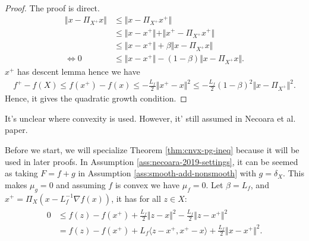 \documentclass[12pt]{report}
\begin{document}
            \begin{proof}
                The proof is direct. 
                \begin{align}
                    \Vert x - \Pi_{X^+}x\Vert 
                    &\le \Vert x - \Pi_{X^+}x^+\Vert
                    \\
                    &\le \Vert x - x^+\Vert + \Vert x^+ - \Pi_{X^+}x^+\Vert
                    \\
                    &\le \Vert x - x^+\Vert + \beta \Vert x - \Pi_{X^+}x\Vert
                    \\
                    \iff 
                    0 &\le \Vert x - x^+\Vert - (1 - \beta) \Vert x - \Pi_{X^+}x\Vert. 
                \end{align}
                $x^+$ has descent lemma hence we have 
                \begin{align*}
                    f^+ - f(X) \le f(x^+) - f(x) 
                    \le - \frac{L_f}{2}\Vert x^+ - x\Vert^2 
                    \le - \frac{L_f}{2}(1 - \beta)^2 \Vert x - \Pi_{X^+}\Vert^2. 
                \end{align*}
                Hence, it gives the quadratic growth condition. 
            \end{proof}
            \begin{remark}
                It's unclear where convexity is used. 
                However, it' still assumed in Necoara et al. paper. 
            \end{remark}
            Before we start, we will specialize Theorem \ref{thm:cnvx-pg-ineq} because it will be used in later proofs. 
            In Assumption \ref{ass:necoara-2019-settings}, it can be seemed as taking $F = f + g$ in Assumption \ref{ass:smooth-add-nonsmooth} with $g = \delta_{X}$. 
            This makes $\mu_g = 0$ and assuming $f$ is convex we have $\mu_f = 0$. 
            Let $\beta = L_f$, and $x^+ = \Pi_{X}(x - L_f^{-1}\nabla f(x))$, it has for all $z \in X$: 
            \begin{align}\label{ineq:proj-grad}
                \begin{split}
                    0 &\le 
                    f(z) - f(x^+) + \frac{L_f}{2}\Vert z - x\Vert^2
                    - \frac{L_f}{2}\Vert z - x^+\Vert^2
                    \\
                    &= 
                    f(z) - f(x^+) + L_f\langle z - x^+, x^+ - x\rangle
                    + \frac{L_f}{2}\Vert x - x^+\Vert^2. 
                \end{split}
            \end{align}
\end{document}

